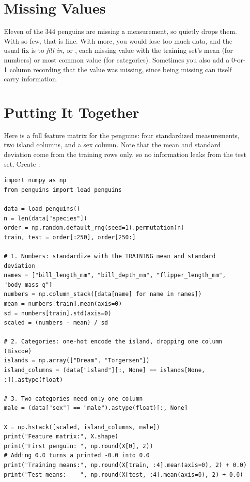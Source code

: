 \section{Missing Values}
Eleven of the 344 penguins are missing a measurement, so  quietly drops them. With
so few, that is fine. With more, you would lose too much data, and the usual fix is to \emph{fill in}, or
, each missing value with the training set's mean (for numbers) or most
common value (for categories). Sometimes you also add a 0-or-1 column recording that the value was missing,
since being missing can itself carry information.

\section{Putting It Together}
Here is a full feature matrix for the penguins: four standardized measurements, two island columns, and a sex
column. Note that the mean and standard deviation come from the training rows only, so no information leaks from
the test set. Create :

\begin{verbatim}
import numpy as np
from penguins import load_penguins

data = load_penguins()
n = len(data["species"])
order = np.random.default_rng(seed=1).permutation(n)
train, test = order[:250], order[250:]

# 1. Numbers: standardize with the TRAINING mean and standard deviation
names = ["bill_length_mm", "bill_depth_mm", "flipper_length_mm", "body_mass_g"]
numbers = np.column_stack([data[name] for name in names])
mean = numbers[train].mean(axis=0)
sd = numbers[train].std(axis=0)
scaled = (numbers - mean) / sd

# 2. Categories: one-hot encode the island, dropping one column (Biscoe)
islands = np.array(["Dream", "Torgersen"])
island_columns = (data["island"][:, None] == islands[None, :]).astype(float)

# 3. Two categories need only one column
male = (data["sex"] == "male").astype(float)[:, None]

X = np.hstack([scaled, island_columns, male])
print("Feature matrix:", X.shape)
print("First penguin: ", np.round(X[0], 2))
# Adding 0.0 turns a printed -0.0 into 0.0
print("Training means:", np.round(X[train, :4].mean(axis=0), 2) + 0.0)
print("Test means:    ", np.round(X[test, :4].mean(axis=0), 2) + 0.0)
\end{verbatim}

